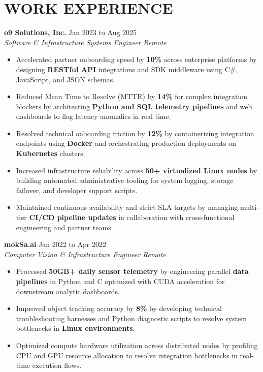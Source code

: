 \documentclass[11pt,letterpaper]{article}
\begin{document}
\section*{WORK EXPERIENCE}
\noindent\small \textbf{o9 Solutions, Inc.} \hfill Jan 2023 to Aug 2025 \\
\textit{Software \& Infrastructure Systems Engineer} \hfill \textit{Remote}
\begin{itemize}
\item Accelerated partner onboarding speed by \textbf{10\%} across enterprise platforms by designing \textbf{RESTful API} integrations and SDK middleware using C#, JavaScript, and JSON schemas.
\item Reduced Mean Time to Resolve (MTTR) by \textbf{14\%} for complex integration blockers by architecting \textbf{Python and SQL telemetry pipelines} and web dashboards to flag latency anomalies in real time.
\item Resolved technical onboarding friction by \textbf{12\%} by containerizing integration endpoints using \textbf{Docker} and orchestrating production deployments on \textbf{Kubernetes} clusters.
\item Increased infrastructure reliability across \textbf{50+ virtualized Linux nodes} by building automated administrative tooling for system logging, storage failover, and developer support scripts.
\item Maintained continuous availability and strict SLA targets by managing multi-tier \textbf{CI/CD pipeline updates} in collaboration with cross-functional engineering and partner teams.
\end{itemize}
\noindent\small \textbf{mokSa.ai} \hfill Jan 2022 to Apr 2022 \\
\textit{Computer Vision \& Infrastructure Engineer} \hfill \textit{Remote}
\begin{itemize}
\item Processed \textbf{50GB+ daily sensor telemetry} by engineering parallel \textbf{data pipelines} in Python and C optimized with CUDA acceleration for downstream analytic dashboards.
\item Improved object tracking accuracy by \textbf{8\%} by developing technical troubleshooting harnesses and Python diagnostic scripts to resolve system bottlenecks in \textbf{Linux environments}.
\item Optimized compute hardware utilization across distributed nodes by profiling CPU and GPU resource allocation to resolve integration bottlenecks in real-time execution flows.
\end{itemize}
\end{document}
